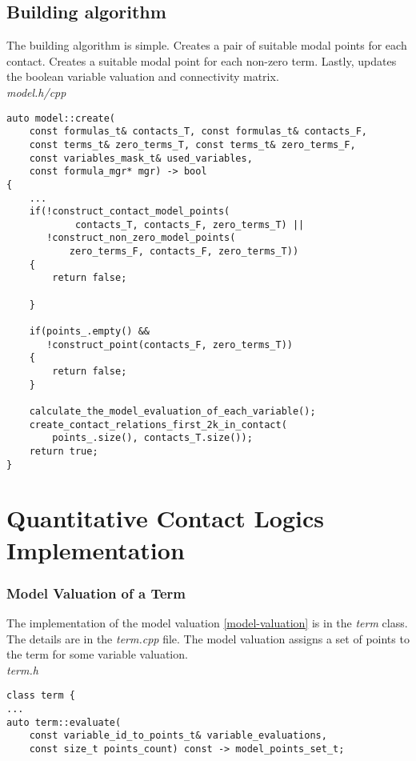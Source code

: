 \documentclass{article}
\begin{document}
	\subsection{Building algorithm}
	The building algorithm is simple. Creates a pair of suitable modal points for each contact. Creates a suitable modal point for each non-zero term. Lastly, updates the boolean variable valuation and connectivity matrix.
\\
\noindent
\textit{model.h/cpp}
\begin{lstlisting}
auto model::create(
	const formulas_t& contacts_T, const formulas_t& contacts_F,
	const terms_t& zero_terms_T, const terms_t& zero_terms_F,
	const variables_mask_t& used_variables,
	const formula_mgr* mgr) -> bool
{
    ...
    if(!construct_contact_model_points(
            contacts_T, contacts_F, zero_terms_T) ||
       !construct_non_zero_model_points(
           zero_terms_F, contacts_F, zero_terms_T))
    {
        return false;

    }

    if(points_.empty() &&
       !construct_point(contacts_F, zero_terms_T))
    {
        return false;
    }

    calculate_the_model_evaluation_of_each_variable();
    create_contact_relations_first_2k_in_contact(
        points_.size(), contacts_T.size());
    return true;
}
\end{lstlisting}

	\newpage
	\section{Quantitative Contact Logics Implementation}
	\subsubsection*{Model Valuation of a Term}
	The implementation of the model valuation \ref{model-valuation} is in the \textit{term} class. The details are in the \textit{term.cpp} file.
	The model valuation assigns a set of points to the term for some variable valuation.
\\
\noindent
\textit{term.h}
\begin{lstlisting}
class term {
...
auto term::evaluate(
	const variable_id_to_points_t& variable_evaluations,
	const size_t points_count) const -> model_points_set_t;
\end{lstlisting}	
\end{document}
